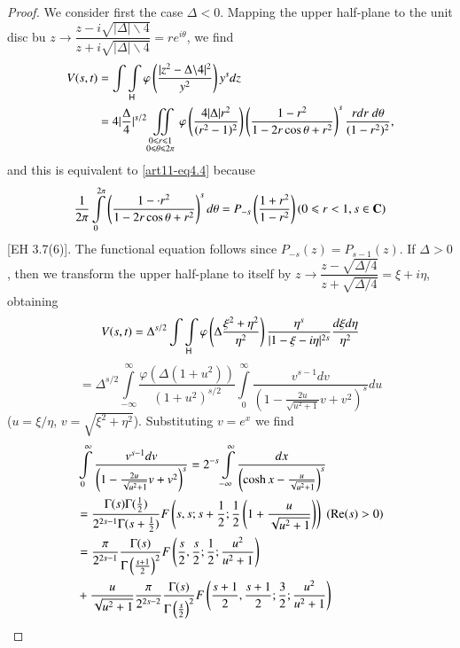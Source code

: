 \begin{proof}
We consider first the case $\Delta < 0$. Mapping the upper half-plane to the unit disc bu $z \to \dfrac{z - i \sqrt{|\Delta|\backslash 4}}{z+ i \sqrt{|\Delta| \backslash 4}} = re^{i\theta}$, we find 
\begin{align*}
V(s,t) &= \int \int\limits_{\mathsf{H}} \varphi \left(\frac{|z^2 - \Delta \backslash 4|^2}{y^2} \right) y^s dz\\
& = 4|\frac{\Delta}{4}|^{s/2} \iint\limits_{\substack{0 \leqslant r \leqslant 1\\ 0 \leqslant \theta \leqslant 2 \pi}} \varphi \left(\frac{4|\Delta|r^2}{(r^2-1)^2} \right) \left(\frac{1-r^2}{1-2 r \cos \theta +r^2} \right)^s \frac{r dr \; d \theta}{ (1-r^2)^2},
\end{align*}
and this is equivalent to \eqref{art11-eq4.4} because
$$
\frac{1}{2\pi} \int\limits^{2 \pi}_0 \left(\frac{1-\cdot r^2}{1-2 r \cos \theta + r^2} \right)^s d \theta = P_{-s} \left(\frac{1+r^2}{1-r^2} \right) (0 \leqslant r < 1, s \in \mathbf{C})
$$
[EH 3.7(6)]. The functional equation follows since $P_{-s} (z) = P_{s-1} (z)$. If $\Delta >0$, then we transform the upper half-plane to itself by $z \to \dfrac{z - \sqrt{\Delta/4}}{z+ \sqrt{\Delta /4}} = \xi + i \eta$, obtaining
$$
V(s,t) = \Delta^{s/2} \int\int\limits_{\mathsf{H}} \varphi \left(\Delta \frac{\xi^2 + \eta^2}{\eta^2} \right) \frac{\eta^s}{|1-\xi - i \eta|^{2s}} \frac{d\xi d \eta}{\eta^2}
$$
$$
= \Delta^{s/2} \int\limits^\infty_{-\infty} \frac{\varphi (\Delta (1+u^2))}{(1+u^2)^{s/2}} \int\limits^\infty_0 \frac{v^{s-1} dv}{\left(1-\frac{2u}{\sqrt{u^2 +1}} v + v^2 \right)^s} du
$$\pageoriginale 
($u = \xi / \eta$, $v = \sqrt{\xi^2 + \eta^2}$). Substituting $v = e^x$ we find 
\begin{align*}
& \int\limits^\infty_0 \frac{v^{s-1} dv}{ \left(1 - \frac{2u}{\sqrt{u^2 +1}} v + v^2 \right)^s} = 2^{-s} \int\limits^\infty_{-\infty} \frac{dx}{\left(\cosh x - \frac{u}{\sqrt{u^2+1}} \right)^s}\\
& = \frac{\Gamma (s) \Gamma (\frac{1}{2})}{2^{2s-1} \Gamma (s+ \frac{1}{2})} F \left(s, s; s+ \frac{1}{2} ;\frac{1}{2} \left(1+ \frac{u}{\sqrt{u^2 +1}} \right) \right) \; (\re (s) > 0)\\
& = \frac{\pi}{2^{2s-1}} \frac{\Gamma (s)}{\Gamma \left(\frac{s+1}{2} \right)^2} F \left(\frac{s}{2}, \frac{s}{2}; \frac{1}{2} ; \frac{u^2}{u^2+1} \right)\\
& + \frac{u}{\sqrt{u^2 +1}} \frac{\pi}{2^{2s-2}} \frac{\Gamma (s)}{\Gamma \left(\frac{s}{2} \right)^2} F \left(\frac{s+1}{2}, \frac{s+1}{2}; \frac{3}{2} ; \frac{u^2}{u^2 +1} \right)

\end{align*}
\end{proof}
